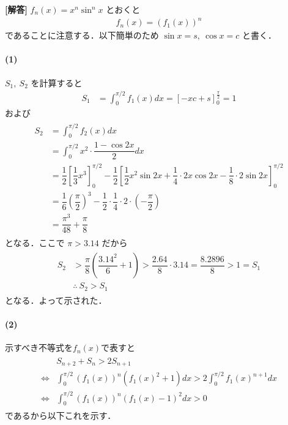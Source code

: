 \documentclass[../../main.tex]{subfiles}
\begin{document}
\begin{oframed}
  
\end{oframed}

{\bf [解答]}
$f_n(x)=x^n\sin^nx$ とおくと
\begin{align}
  f_n(x) = \left(f_1(x)\right)^n
\end{align}
であることに注意する．以下簡単のため $\sin x=s,\ \cos x=c$ と書く．

\paragraph{(1)}
$S_1,\ S_2$ を計算すると
\begin{align}
  S_1&=\int_0^{\pi/2}f_1(x)dx=\left[-xc+s\right]_0^{\frac{\pi}{2}}=1
\end{align}
および
\begin{align}
  \begin{split}
    S_2
    &=\int_0^{\pi/2}f_2(x)dx \\
    &=\int_0^{\pi/2}x^2\cdot\dfrac{1-\cos2x}{2}dx \\
    &=\dfrac{1}{2}\left[\dfrac{1}{3}x^3\right]_0^{\pi/2}-\dfrac{1}{2}\left[\dfrac{1}{2}x^2\sin2x+\dfrac{1}{4}\cdot2x\cos2x-\dfrac{1}{8}\cdot2\sin2x\right]_0^{\pi/2} \\
    &=\dfrac{1}{6}\left(\dfrac{\pi}{2}\right)^3-\dfrac{1}{2}\cdot\dfrac{1}{4}\cdot2\cdot\left(-\dfrac{\pi}{2}\right) \\
    &=\dfrac{\pi^3}{48}+\dfrac{\pi}{8}
  \end{split}
\end{align}
となる．ここで $\pi>3.14$ だから
\begin{align}
  \begin{split}
    S_2&>\dfrac{\pi}{8}\left(\dfrac{3.14^2}{6}+1\right)>\dfrac{2.64}{8}\cdot3.14=\dfrac{8.2896}{8}>1=S_1 \\
    &\therefore\ S_2>S_1
  \end{split}
\end{align}
となる．よって示された．

\paragraph{(2)}
示すべき不等式を$f_n(x)$で表すと
\begin{align}
  \begin{split}
    & S_{n+2}+S_n >2S_{n+1} \\
    \iff & \int_0^{\pi/2}\left(f_1(x)\right)^n(f_1(x)^2+1)dx>2\int_0^{\pi/2}f_1(x)^{n+1}dx \\
    \iff & \int_0^{\pi/2}\left(f_1(x)\right)^n(f_1(x)-1)^2dx>0 \label{eq:1}
  \end{split}
\end{align}
であるから以下これを示す．
\end{document}
